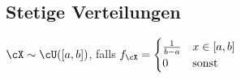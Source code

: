 \subsection{Stetige Verteilungen}
\shortdefinition[Gleichverteilung] $\cX \sim \cU([a, b])$, falls $f_\cX = \begin{cases}
    \frac{1}{b - a} & x \in [a, b] \\
    0               & \text{sonst}
\end{cases}$
